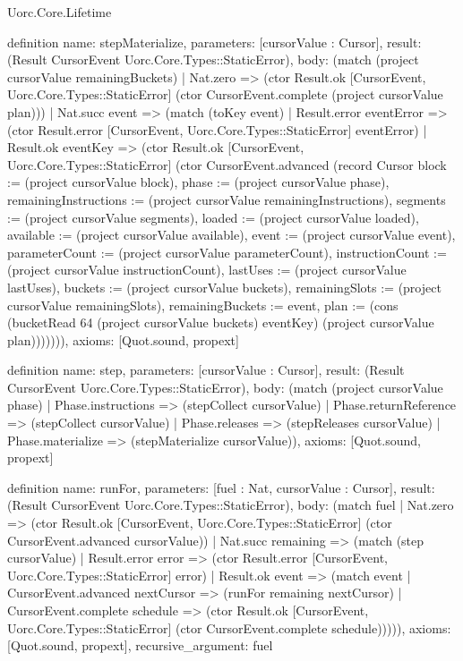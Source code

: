 \begin{lexlean}{Uorc.Core.Lifetime}
\begin{semanticmodule}
definition{
  name: stepMaterialize,
  parameters: [cursorValue : Cursor],
  result: (Result CursorEvent Uorc.Core.Types::StaticError),
  body: (match (project cursorValue remainingBuckets)
    | Nat.zero => (ctor Result.ok [CursorEvent, Uorc.Core.Types::StaticError] (ctor CursorEvent.complete (project cursorValue plan)))
    | Nat.succ event => (match (toKey event)
      | Result.error eventError => (ctor Result.error [CursorEvent, Uorc.Core.Types::StaticError] eventError)
      | Result.ok eventKey => (ctor Result.ok [CursorEvent, Uorc.Core.Types::StaticError] (ctor CursorEvent.advanced (record Cursor {block := (project cursorValue block), phase := (project cursorValue phase), remainingInstructions := (project cursorValue remainingInstructions), segments := (project cursorValue segments), loaded := (project cursorValue loaded), available := (project cursorValue available), event := (project cursorValue event), parameterCount := (project cursorValue parameterCount), instructionCount := (project cursorValue instructionCount), lastUses := (project cursorValue lastUses), buckets := (project cursorValue buckets), remainingSlots := (project cursorValue remainingSlots), remainingBuckets := event, plan := (cons (bucketRead 64 (project cursorValue buckets) eventKey) (project cursorValue plan))}))))),
  axioms: [Quot.sound, propext]
}

definition{
  name: step,
  parameters: [cursorValue : Cursor],
  result: (Result CursorEvent Uorc.Core.Types::StaticError),
  body: (match (project cursorValue phase)
    | Phase.instructions => (stepCollect cursorValue)
    | Phase.returnReference => (stepCollect cursorValue)
    | Phase.releases => (stepReleases cursorValue)
    | Phase.materialize => (stepMaterialize cursorValue)),
  axioms: [Quot.sound, propext]
}

definition{
  name: runFor,
  parameters: [fuel : Nat, cursorValue : Cursor],
  result: (Result CursorEvent Uorc.Core.Types::StaticError),
  body: (match fuel
    | Nat.zero => (ctor Result.ok [CursorEvent, Uorc.Core.Types::StaticError] (ctor CursorEvent.advanced cursorValue))
    | Nat.succ remaining => (match (step cursorValue)
      | Result.error error => (ctor Result.error [CursorEvent, Uorc.Core.Types::StaticError] error)
      | Result.ok event => (match event
        | CursorEvent.advanced nextCursor => (runFor remaining nextCursor)
        | CursorEvent.complete schedule => (ctor Result.ok [CursorEvent, Uorc.Core.Types::StaticError] (ctor CursorEvent.complete schedule))))),
  axioms: [Quot.sound, propext],
  recursive_argument: fuel
}


\end{semanticmodule}
\end{lexlean}
